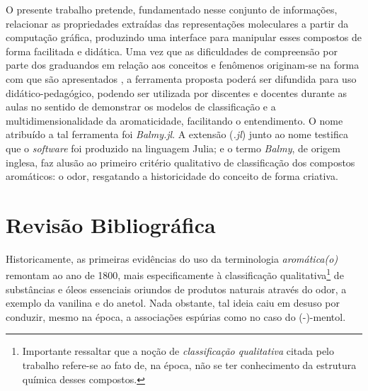 O presente trabalho pretende, fundamentado nesse conjunto de informações, relacionar as propriedades extraídas das representações moleculares a partir da computação gráfica, produzindo uma interface para manipular esses compostos de forma facilitada e didática. Uma vez que as dificuldades de compreensão por parte dos graduandos em relação aos conceitos e fenômenos originam-se na forma com que são apresentados \autocite{Cunha2018}, a ferramenta proposta poderá ser difundida para uso didático-pedagógico, podendo ser utilizada por discentes e docentes durante as aulas no sentido de demonstrar os modelos de classificação e a multidimensionalidade da aromaticidade, facilitando o entendimento. O nome atribuído a tal ferramenta foi \textit{Balmy.jl}. A extensão (\textit{.jl}) junto ao nome testifica que o \textit{software} foi produzido na linguagem Julia; e o termo \textit{Balmy}, de origem inglesa, faz alusão ao primeiro critério qualitativo de classificação dos compostos aromáticos: o odor, resgatando a historicidade do conceito de forma criativa.


\chapter{Revisão Bibliográfica}

Historicamente, as primeiras evidências do uso da terminologia \textit{aromática(o)} remontam ao ano de 1800, mais especificamente à classificação qualitativa\footnote{Importante ressaltar que a noção de \textit{classificação qualitativa} citada pelo trabalho refere-se ao fato de, na época, não se ter conhecimento da estrutura química desses compostos.} de substâncias e óleos essenciais oriundos de produtos naturais através do odor, a exemplo da vanilina e do anetol. Nada obstante, tal ideia caiu em desuso por conduzir, mesmo na época, a associações espúrias como no caso do (-)-mentol.

